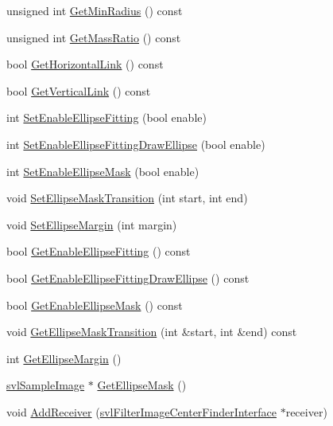 \begin{DoxyCompactItemize}
\item 
unsigned int \hyperlink{classsvl_filter_image_center_finder_aee57a2627e70cf9d615f38cd833e5f8a}{Get\+Min\+Radius} () const 
\item 
unsigned int \hyperlink{classsvl_filter_image_center_finder_a0041521938da500f3e478083f447a709}{Get\+Mass\+Ratio} () const 
\item 
bool \hyperlink{classsvl_filter_image_center_finder_a0293e49d410ca18049ca7e7b09585229}{Get\+Horizontal\+Link} () const 
\item 
bool \hyperlink{classsvl_filter_image_center_finder_a395359676b6956f465dcf283d78e40ac}{Get\+Vertical\+Link} () const 
\item 
int \hyperlink{classsvl_filter_image_center_finder_a3fb0d14197e6e0e67918a075c17a0db3}{Set\+Enable\+Ellipse\+Fitting} (bool enable)
\item 
int \hyperlink{classsvl_filter_image_center_finder_a3c3ac4525b0adf2c9c9b74d80e0298a1}{Set\+Enable\+Ellipse\+Fitting\+Draw\+Ellipse} (bool enable)
\item 
int \hyperlink{classsvl_filter_image_center_finder_a3f9384ebde6adbddb079ef78519de0c5}{Set\+Enable\+Ellipse\+Mask} (bool enable)
\item 
void \hyperlink{classsvl_filter_image_center_finder_ae0183d7a26a709a6b082cd61b01794a1}{Set\+Ellipse\+Mask\+Transition} (int start, int end)
\item 
void \hyperlink{classsvl_filter_image_center_finder_a2876dab0dd034e15d830ffc5d48a44a3}{Set\+Ellipse\+Margin} (int margin)
\item 
bool \hyperlink{classsvl_filter_image_center_finder_a799c53cec676b9ca3160eb28bd1d3596}{Get\+Enable\+Ellipse\+Fitting} () const 
\item 
bool \hyperlink{classsvl_filter_image_center_finder_ad973c1a4515262bdf318e5c99d9404cf}{Get\+Enable\+Ellipse\+Fitting\+Draw\+Ellipse} () const 
\item 
bool \hyperlink{classsvl_filter_image_center_finder_af15908037b03b9b4fa2460942286f527}{Get\+Enable\+Ellipse\+Mask} () const 
\item 
void \hyperlink{classsvl_filter_image_center_finder_a614e6915f7414a9e40e4fa46fb3980c0}{Get\+Ellipse\+Mask\+Transition} (int \&start, int \&end) const 
\item 
int \hyperlink{classsvl_filter_image_center_finder_a3e6b3ab69cd202bdb0f67b3a944f4e1f}{Get\+Ellipse\+Margin} ()
\item 
\hyperlink{classsvl_sample_image}{svl\+Sample\+Image} $\ast$ \hyperlink{classsvl_filter_image_center_finder_a12e845a087b8a9ae26ecbe5054491514}{Get\+Ellipse\+Mask} ()
\item 
void \hyperlink{classsvl_filter_image_center_finder_a634d4134222a107752c50cac50a5a48b}{Add\+Receiver} (\hyperlink{classsvl_filter_image_center_finder_interface}{svl\+Filter\+Image\+Center\+Finder\+Interface} $\ast$receiver)
\end{DoxyCompactItemize}
